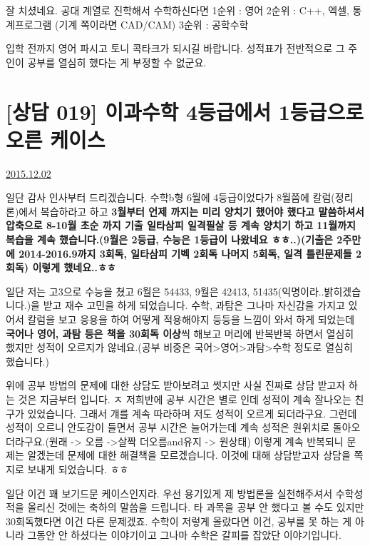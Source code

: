 잘 치셨네요.
공대 계열로 진학해서 수학하신다면
1순위 : 영어
2순위 : C++, 엑셀, 통계프로그램 (기계 쪽이라면 CAD/CAM)
3순위 : 공학수학
\vspace{5mm}

입학 전까지 영어 파시고 토니 콕타크가 되시길 바랍니다.
성적표가 전반적으로 그 주인이 공부를 열심히 했다는 게 부정할 수 없군요.
\vspace{5mm}






\section{[상담 019] 이과수학 4등급에서 1등급으로 오른 케이스}
\href{https://www.kockoc.com/Apoc/524423}{2015.12.02}

\vspace{5mm}

일단 감사 인사부터 드리겠습니다. 수학b형 6월에 4등급이었다가 8월쯤에 칼럼(정리론)에서 복습하라고 하고 \textbf{3월부터 언제 까지는 미리 양치기 했어야 했다고 말씀하셔서 압축으로 8-10월 초순 까지 기출 일타삼피 일격필살 등 계속 양치기 하고 11월까지 복습을 계속 했습니다.(9월은 2등급, 수능은 1등급이 나왔네요 ㅎㅎ..)(기출은 2주만에 2014-2016.9까지 3회독, 일타삼피 기벡 2회독 나머지 5회독, 일격 틀린문제들 2회독) 이렇게 했네요..ㅎㅎ}
\vspace{5mm}

일단 저는 고3으로 수능을 쳤고 6월은 54433, 9월은 42413,  51435(익명이라..밝히겠습니다.)을 받고 재수 고민을 하게 되었습니다.
수학, 과탐은 그나마 자신감을 가지고 있어서 칼럼을 보고 응용을 하여 어떻게 적용해야지 등등을 느낌이 와서 하게 되었는데 \textbf{국어나 영어, 과탐 등은 책을 30회독 이상}씩 해보고 머리에 반복반복 하면서 열심히 했지만 성적이 오르지가 않네요.(공부 비중은 국어>영어>과탐>수학 정도로 열심히 했습니다.)
\vspace{5mm}

위에 공부 방법의 문제에 대한 상담도 받아보려고 썻지만
사실 진짜로 상담 받고자 하는 것은 지금부터 입니다.
ㅈ 저희반에 공부 시간은 별로 인데 성적이 계속 잘나오는 친구가 있었습니다.
그래서 걔를 계속 따라하며 저도 성적이 오르게 되더라구요. 그런데 성적이 오르니 안도감이 들면서 공부 시간은 늘어가는데 계속 성적은 원위치로 돌아오더라구요.(원래 -> 오름 ->살짝 더오름and유지 -> 원상태)
이렇게 계속 반복되니 문제는 알겠는데 문제에 대한 해결책을 모르겠습니다.
이것에 대해 상담받고자 상담을 쪽지로 보내게 되었습니다. ㅎㅎ
\vspace{5mm}

일단 이건 꽤 보기드문 케이스인지라.
우선 용기있게 제 방법론을 실천해주셔서 수학성적을 올리신 것에는 축하의 말씀을 드립니다.
타 과목을 공부 안 했다고 볼 수도 있지만 30회독했다면 이건 다른 문제겠죠.
수학이 저렇게 올랐다면 이건, 공부를 못 하는 게 아니라 그동안 안 하셨다는 이야기이고 그나마 수학은 갈피를 잡았단 이야기입니다.
\vspace{5mm}

